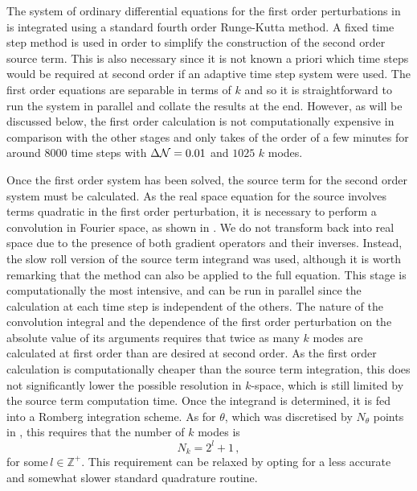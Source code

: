 The system of ordinary differential equations for the first order
perturbations in  is integrated using a standard fourth order
Runge-Kutta method. A fixed time step method is used in order to
simplify the construction of the  second order source term.
This is also necessary since it is not known a priori
which time steps would be required at
second order if an adaptive time step system were used. The first
order equations are separable in terms of $k$ and so it is
straightforward to run the system in parallel and collate
the results at the end. However, as will be discussed below, the first
order calculation is not computationally expensive in comparison with
the other stages and only takes of the order of a few minutes for around
$8000$ time steps with $\Delta \mathcal{N}=0.01$ and $1025$ $k$ modes.


Once the first order system has been solved, 
the source term for the second order system must be calculated. As the
real space equation for the source involves terms quadratic in the
first order perturbation, it is necessary to perform a convolution in
Fourier space, as shown in .  We do not transform
back into real space due to the presence of both
gradient operators and their inverses. 
Instead, the slow roll version of
the source term integrand was used, although it is worth remarking that the method
can also be
applied to the full equation. This stage is computationally the most
intensive, and can be run in parallel since the calculation at each time step is
independent of the others. The nature of the convolution integral and the
dependence of the first order perturbation on the absolute value of
its arguments requires that twice as many $k$ modes are calculated at
first order than are desired at second order.  As
the first order calculation is computationally cheaper than the source
term integration, this does not significantly lower the possible
resolution in $k$-space, which is still limited by the source term
computation time.  Once the integrand is determined, it is fed into a
Romberg integration scheme. As for $\theta$,  which was
discretised by $N_\theta$ points in , this requires that the
number of $k$ modes is
%
\begin{equation}
\label{eq:nk-constraint-num}
N_k=2^l + 1\,,
\end{equation}
%
for some\footnotemark $\,l\in\mathbb{Z}^+$. 
This requirement can be relaxed by opting for a less
accurate and somewhat slower standard quadrature routine.



